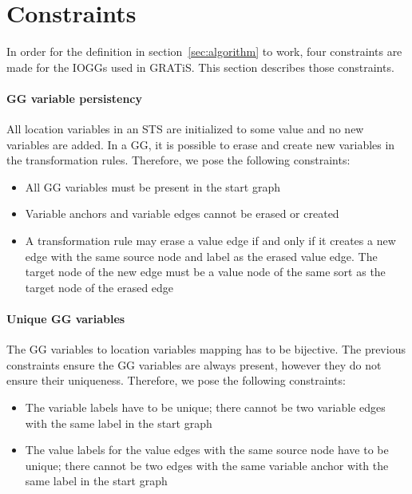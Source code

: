 \section{Constraints}\label{sec:constraints}
In order for the definition in section~\ref{sec:algorithm} to work, four constraints are made for the IOGGs used in GRATiS. This section describes those constraints.

\paragraph*{GG variable persistency} All location variables in an STS are initialized to some value and no new variables are added. In a GG, it is possible to erase and create new variables in the transformation rules. Therefore, we pose the following constraints:
\begin{itemize}
\item All GG variables must be present in the start graph
\item Variable anchors and variable edges cannot be erased or created
\item A transformation rule may erase a value edge if and only if it creates a new edge with the same source node and label as the erased value edge. The target node of the new edge must be a value node of the same sort as the target node of the erased edge
\end{itemize}

\paragraph*{Unique GG variables}
The GG variables to location variables mapping has to be bijective. The previous constraints ensure the GG variables are always present, however they do not ensure their uniqueness. Therefore, we pose the following constraints:
\begin{itemize}
\item The variable labels have to be unique; there cannot be two variable edges with the same label in the start graph
\item The value labels for the value edges with the same source node have to be unique; there cannot be two edges with the same variable anchor with the same label in the start graph
\end{itemize}


